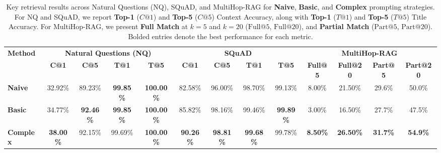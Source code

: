\begin{table*}[t]
\centering
\small
\caption{Key retrieval results across Natural Questions (NQ), SQuAD, and MultiHop-RAG for 
\textbf{Naive}, \textbf{Basic}, and \textbf{Complex} prompting strategies. 
For NQ and SQuAD, we report \textbf{Top-1} (\(C@1\)) and \textbf{Top-5} (\(C@5\)) Context Accuracy, 
along with \textbf{Top-1} (\(T@1\)) and \textbf{Top-5} (\(T@5\)) Title Accuracy. 
For MultiHop-RAG, we present \textbf{Full Match} at \(k=5\) and \(k=20\) (\(\text{Full@}5\), \(\text{Full@}20\)), 
and \textbf{Partial Match} (\(\text{Part@}5\), \(\text{Part@}20\)). 
Bolded entries denote the best performance for each metric.}
\label{tab:combined-results}
\renewcommand{\arraystretch}{1.1}
\begin{tabular}{l|cccc|cccc|cccc}
\toprule
\multirow{2}{*}{\textbf{Method}} 
& \multicolumn{4}{c|}{\textbf{Natural Questions (NQ)}} 
& \multicolumn{4}{c|}{\textbf{SQuAD}} 
& \multicolumn{4}{c}{\textbf{MultiHop-RAG}} \\
\cmidrule(lr){2-5}\cmidrule(lr){6-9}\cmidrule(lr){10-13}
& \textbf{C@1} & \textbf{C@5} & \textbf{T@1} & \textbf{T@5} 
& \textbf{C@1} & \textbf{C@5} & \textbf{T@1} & \textbf{T@5}
& \textbf{Full@5} & \textbf{Full@20} & \textbf{Part@5} & \textbf{Part@20} \\
\midrule
\textbf{Naive} 
& 32.92\% & 89.23\% & \textbf{99.85\%} & \textbf{100.00\%}
& 82.58\% & 96.00\% & 98.70\% & 99.13\%
& 8.00\%  & 21.50\% & 29.6\%  & 50.0\%  \\
\textbf{Basic} 
& 34.77\% & \textbf{92.46\%} & \textbf{99.85\%} & \textbf{100.00\%}
& 85.82\% & 98.16\% & 99.46\% & \textbf{99.89\%}
& 3.00\%  & 16.50\% & 27.7\%  & 47.5\%  \\
\textbf{Complex} 
& \textbf{38.00\%} & 92.15\% & 99.69\% & \textbf{100.00\%}
& \textbf{90.26\%} & \textbf{98.81\%} & \textbf{99.68\%} & 99.78\%
& \textbf{8.50\%} & \textbf{26.50\%} & \textbf{31.7\%} & \textbf{54.9\%} \\
\bottomrule
\end{tabular}
\end{table*}




